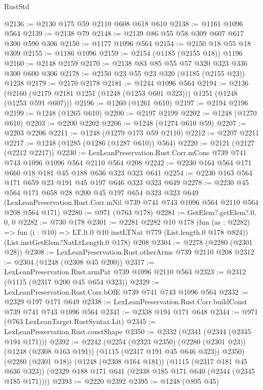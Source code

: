 \begin{lexlean}{RustStd}
\begin{coremodule}
@2136 := @2130 @175 @59 @2110 @608 @618 @610
@2138 := @1161 @1096 @564
@2139 := @2138 @79
@2148 := @2139 @86 @55 @58 @309 @607 @617 @300 @590 @306
@2150 := @1177 @1096 @564
@2154 := @2150 @18 @55 @18 @309
@2155 := @1186 @1096
@2159 := @2154 (@1185 (@2155 @18)) @1196
@2160 := @2148 @2159
@2170 := @2138 @83 @85 @55 @57 @320 @323 @336 @300 @600 @306
@2178 := @2150 @23 @55 @23 @320 (@1185 (@2155 @23)) @1238
@2179 := @2170 @2178
@2181 := @1244 @1096 @564
@2194 := @2136 (@2160 (@2179 @2181 @1251 (@1248 (@1253 @601 @323))) @1251 (@1248 (@1253 @591 @607)))
@2196 := @1260 (@1261 @610)
@2197 := @2194 @2196
@2199 := @1248 (@1265 @610)
@2200 := @2197 @2199
@2202 := @1248 (@1270 @610)
@2203 := @2200 @2202
@2206 := @1248 (@1274 @610 @59)
@2207 := @2203 @2206
@2211 := @1248 (@1279 @173 @59 @2110)
@2212 := @2207 @2211
@2217 := @1248 (@1285 (@1286 (@1287 @610)) @564)
@2220 := @2121 (@2127 (@2212 @2217))
@2230 := LexLeanPreservation.Rust.Corr.mCons @739 @741 @743 @1096 @1096 @564 @2110 @564 @208
@2242 := @2230 @164 @564 @171 @660 @18 @181 @45 @188 @636 @323 @323 @641
@2254 := @2230 @163 @564 @171 @659 @23 @191 @45 @197 @646 @323 @323 @649
@2278 := @2230
    @45
    @564
    @171
    @658
    @28
    @200
    @45
    @197
    @654
    @323
    @323
    @649
    (LexLeanPreservation.Rust.Corr.mNil @739 @741 @743 @1096 @564 @2110 @564 @208 @564 @171)
@2280 := @971 (@763 @178)
@2281 := GetElem?.getElem?.{0, 0, 0}
@2282 := @730 @178
@2301 := @2281
    @2282
    @10
    @178
    (fun (as : @2282) => fun (i : @10) => LT.lt.{0} @10 instLTNat @779 (List.length.{0} @178 @824))
    (List.instGetElem?NatLtLength.{0} @178)
    @208
@2304 := @2278 (@2280 (@2301 @28))
@2308 := LexLeanPreservation.Rust.otherArms @739 @2110 @208
@2312 := @2304 (@1248 (@2308 @45 @200))
@2317 := LexLeanPreservation.Rust.armPat @739 @1096 @2110 @564
@2323 := @2312 (@1115 (@2317 @200 @45 @654 @323))
@2329 := LexLeanPreservation.Rust.Corr.bOfE @739 @741 @743 @1096 @564
@2332 := @2329 @197 @171 @649
@2338 := LexLeanPreservation.Rust.Corr.buildConst @739 @741 @743 @1096 @564
@2341 := @2338 @194 @171 @648
@2344 := @971 (@763 LexLeanTarget.RustSyntax.Lit)
@2345 := LexLeanPreservation.Rust.constShape
@2350 := @2332 (@2341 (@2344 (@2345 @194 @171)))
@2392 := @2242
    (@2254
      (@2323 @2350)
      (@2280 (@2301 @23))
      (@1248 (@2308 @163 @191))
      (@1115 (@2317 @191 @45 @646 @323))
      @2350)
    (@2280 (@2301 @18))
    (@1248 (@2308 @164 @181))
    (@1115 (@2317 @181 @45 @636 @323))
    (@2329 @188 @171 @641 (@2338 @185 @171 @640 (@2344 (@2345 @185 @171))))
@2393 := @2220 @2392
@2395 := @1248 (@895 @45)

\end{coremodule}
\end{lexlean}

